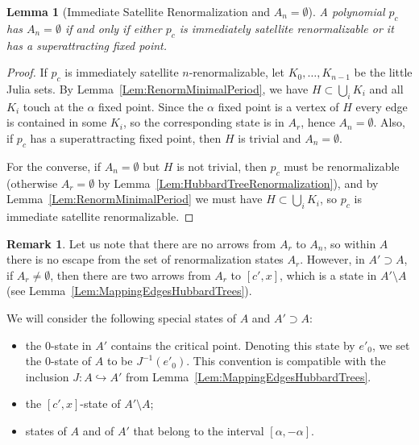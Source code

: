 \documentclass[12pt]{amsart}
\newcommand{\0}{\texttt{0}}
\newcommand{\1}{\texttt{1}}
\newtheorem{lemma}[theorem]{Lemma}
\theoremstyle{definition}
\newtheorem*{remark}{Remark}
\numberwithin{equation}{section}
\newcommand{\lineclear}{\rule{0pt}{2pt}\newline}
\begin{document}
\begin{lemma}[Immediate Satellite Renormalization and $A_n=\emptyset$]
\lineclear
A polynomial $p_c$ has $A_n=\emptyset$ if and only if either $p_c$ is immediately satellite renormalizable or it has a superattracting fixed point. \end{lemma}
\begin{proof}

If $p_c$ is immediately satellite $n$-renormalizable, let $K_0,\dots,K_{n-1}$ be the little Julia sets. By Lemma~\ref{Lem:RenormMinimalPeriod}, we have $H\subset \bigcup_i K_i$ and all $K_i$ touch at the $\alpha$ fixed point. Since the $\alpha$ fixed point is a vertex of $H$ every edge is contained in some $K_i$, so the corresponding state is in $A_r$, hence $A_n=\emptyset$. Also, if $p_c$ has a superattracting fixed point, then $H$ is trivial and $A_n=\emptyset$.


For the converse, if $A_n=\emptyset$ but $H$ is not trivial, then $p_c$ must be renormalizable (otherwise $A_r=\emptyset$ by Lemma~\ref{Lem:HubbardTreeRenormalization}), and by Lemma~\ref{Lem:RenormMinimalPeriod} we must have $H\subset\bigcup_i K_i$, so $p_c$ is immediate satellite renormalizable.
\end{proof}






\begin{remark}
Let us note that there are no arrows from $A_r$ to $A_n$, so within $A$ there is no escape from the set of renormalization states $A_r$. However, in $A'\supset A$, if $A_r\neq\emptyset$, then there are two arrows from $A_r$ to $[c',x]$, which is a state in $A'\setminus A$ (see Lemma~\ref{Lem:MappingEdgesHubbardTrees}).
\end{remark}

\goodbreak

We will consider the following special states of $A$ and $A'\supset A$:
\begin{itemize}
\item 
the $0$-state in $A'$ contains the critical point. 
Denoting this state by $e'_0$, we set the $0$-state of $A$ to be $J^{-1}(e'_0)$. This convention is compatible with the inclusion $J\colon A\hookrightarrow A'$ from Lemma~\ref{Lem:MappingEdgesHubbardTrees}.
\item 
the $[c',x]$-state of $A'\setminus A$;
\item 
states of $A$ and of $A'$ that belong to the interval $[\alpha, -\alpha]$.
\end{itemize}
\end{document}
